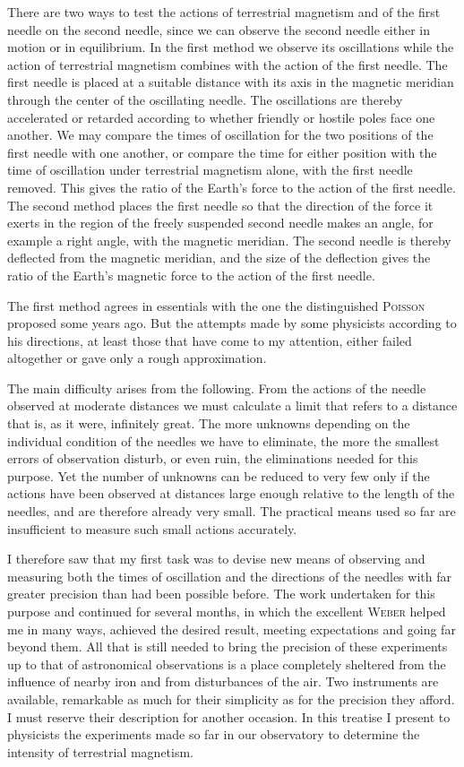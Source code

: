 There are two ways to test the actions of terrestrial magnetism and of the first needle on the second needle, since we can observe the second needle either in motion or in equilibrium. In the first method we observe its oscillations while the action of terrestrial magnetism combines with the action of the first needle. The first needle is placed at a suitable distance with its axis in the magnetic meridian through the center of the oscillating needle. The oscillations are thereby accelerated or retarded according to whether friendly or hostile poles face one another. We may compare the times of oscillation for the two positions of the first needle with one another, or compare the time for either position with the time of oscillation under terrestrial magnetism alone, with the first needle removed. This gives the ratio of the Earth's force to the action of the first needle. The second method places the first needle so that the direction of the force it exerts in the region of the freely suspended second needle makes an angle, for example a right angle, with the magnetic meridian. The second needle is thereby deflected from the magnetic meridian, and the size of the deflection gives the ratio of the Earth's magnetic force to the action of the first needle.

The first method agrees in essentials with the one the distinguished \textsc{Poisson} proposed some years ago. But the attempts made by some physicists according to his directions, at least those that have come to my attention, either failed altogether or gave only a rough approximation.

The main difficulty arises from the following. From the actions of the needle observed at moderate distances we must calculate a limit that refers to a distance that is, as it were, infinitely great. The more unknowns depending on the individual condition of the needles we have to eliminate, the more the smallest errors of observation disturb, or even ruin, the eliminations needed for this purpose. Yet the number of unknowns can be reduced to very few only if the actions have been observed at distances large enough relative to the length of the needles, and are therefore already very small. The practical means used so far are insufficient to measure such small actions accurately.

I therefore saw that my first task was to devise new means of observing and measuring both the times of oscillation and the directions of the needles with far greater precision than had been possible before. The work undertaken for this purpose and continued for several months, in which the excellent \textsc{Weber} helped me in many ways, achieved the desired result, meeting expectations and going far beyond them. All that is still needed to bring the precision of these experiments up to that of astronomical observations is a place completely sheltered from the influence of nearby iron and from disturbances of the air. Two instruments are available, remarkable as much for their simplicity as for the precision they afford. I must reserve their description for another occasion. In this treatise I present to physicists the experiments made so far in our observatory to determine the intensity of terrestrial magnetism.

